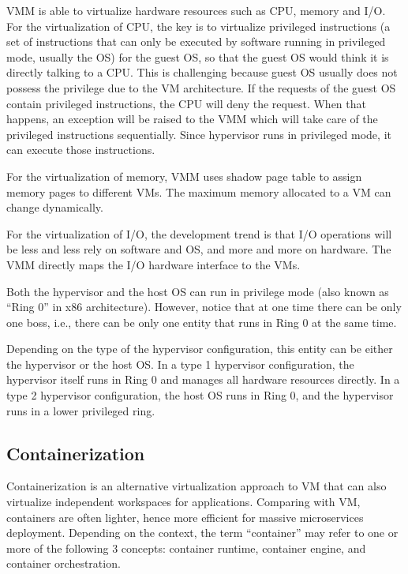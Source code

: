 VMM is able to virtualize hardware resources such as CPU, memory and I/O. For the virtualization of CPU, the key is to virtualize privileged instructions (a set of instructions that can only be executed by software running in privileged mode, usually the OS) for the guest OS, so that the guest OS would think it is directly talking to a CPU. This is challenging because guest OS usually does not possess the privilege due to the VM architecture. If the requests of the guest OS contain privileged instructions, the CPU will deny the request. When that happens, an exception will be raised to the VMM which will take care of the privileged instructions sequentially. Since hypervisor runs in privileged mode, it can execute those instructions.

For the virtualization of memory, VMM uses shadow page table to assign memory pages to different VMs. The maximum memory allocated to a VM can change dynamically.

For the virtualization of I/O, the development trend is that I/O operations will be less and less rely on software and OS, and more and more on hardware. The VMM directly maps the I/O hardware interface to the VMs.

\begin{shortbox}
	Both the hypervisor and the host OS can run in privilege mode (also known as ``Ring 0'' in x86 architecture). However, notice that at one time there can be only one boss, i.e., there can be only one entity that runs in Ring 0 at the same time.
	
	Depending on the type of the hypervisor configuration, this entity can be either the hypervisor or the host OS. In a type 1 hypervisor configuration, the hypervisor itself runs in Ring 0 and manages all hardware resources directly. In a type 2 hypervisor configuration, the host OS runs in Ring 0, and the hypervisor runs in a lower privileged ring.
\end{shortbox}

\subsection{Containerization}

Containerization is an alternative virtualization approach to VM that can also virtualize independent workspaces for applications. Comparing with VM, containers are often lighter, hence more efficient for massive microservices deployment. Depending on the context, the term ``container'' may refer to one or more of the following 3 concepts: container runtime, container engine, and container orchestration.

